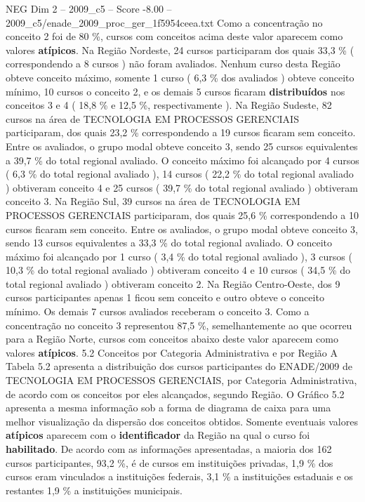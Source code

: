\begin{textsample}{NEG Dim 2 – 2009\_c5 – Score -8.00 – 2009\_c5/enade\_2009\_proc\_ger\_1f5954ceea.txt}
Como a concentração no conceito 2 foi de 80 \%, cursos com conceitos acima deste valor aparecem como valores \textbf{atípicos}.
Na Região Nordeste, 24 cursos participaram dos quais 33,3 \% ( correspondendo a 8 cursos ) não foram avaliados.
Nenhum curso desta Região obteve conceito máximo, somente 1 curso ( 6,3 \% dos avaliados ) obteve conceito mínimo, 10 cursos o conceito 2, e os demais 5 cursos ficaram \textbf{distribuídos} nos conceitos 3 e 4 ( 18,8 \% e 12,5 \%, respectivamente ).
Na Região Sudeste, 82 cursos na área de TECNOLOGIA EM PROCESSOS GERENCIAIS participaram, dos quais 23,2 \% correspondendo a 19 cursos ficaram sem conceito.
Entre os avaliados, o grupo modal obteve conceito 3, sendo 25 cursos equivalentes a 39,7 \% do total regional avaliado.
O conceito máximo foi alcançado por 4 cursos ( 6,3 \% do total regional avaliado ), 14 cursos ( 22,2 \% do total regional avaliado ) obtiveram conceito 4 e 25 cursos ( 39,7 \% do total regional avaliado ) obtiveram conceito 3.
Na Região Sul, 39 cursos na área de TECNOLOGIA EM PROCESSOS GERENCIAIS participaram, dos quais 25,6 \% correspondendo a 10 cursos ficaram sem conceito.
Entre os avaliados, o grupo modal obteve conceito 3, sendo 13 cursos equivalentes a 33,3 \% do total regional avaliado.
O conceito máximo foi alcançado por 1 curso ( 3,4 \% do total regional avaliado ), 3 cursos ( 10,3 \% do total regional avaliado ) obtiveram conceito 4 e 10 cursos ( 34,5 \% do total regional avaliado ) obtiveram conceito 2.
Na Região Centro-Oeste, dos 9 cursos participantes apenas 1 ficou sem conceito e outro obteve o conceito mínimo.
Os demais 7 cursos avaliados receberam o conceito 3.
Como a concentração no conceito 3 representou 87,5 \%, semelhantemente ao que ocorreu para a Região Norte, cursos com conceitos abaixo deste valor aparecem como valores \textbf{atípicos}. 5.2 Conceitos por Categoria Administrativa e por Região A Tabela 5.2 apresenta a distribuição dos cursos participantes do ENADE/2009 de TECNOLOGIA EM PROCESSOS GERENCIAIS, por Categoria Administrativa, de acordo com os conceitos por eles alcançados, segundo Região.
O Gráfico 5.2 apresenta a mesma informação sob a forma de diagrama de caixa para uma melhor visualização da dispersão dos conceitos obtidos.
Somente eventuais valores \textbf{atípicos} aparecem com o \textbf{identificador} da Região na qual o curso foi \textbf{habilitado}.
De acordo com as informações apresentadas, a maioria dos 162 cursos participantes, 93,2 \%, é de cursos em instituições privadas, 1,9 \% dos cursos eram vinculados a instituições federais, 3,1 \% a instituições estaduais e os restantes 1,9 \% a instituições municipais.

\end{textsample}

